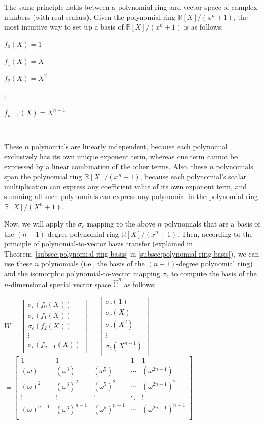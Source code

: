 The same principle holds between a polynomial ring and vector space of complex numbers (with real scalars). Given the polynomial ring $\mathbb{R}[X]/(x^n + 1)$, the most intuitive way to set up a basis of $\mathbb{R}[X]/(x^n + 1)$ is as follows:

$f_0(X) = 1$

$f_1(X) = X$

$f_2(X) = X^2$

$\vdots$

$f_{n-1}(X) = X^{n-1}$

$ $

These $n$ polynomials are linearly independent, because each polynomial exclusively has its own unique exponent term, whereas one term cannot be expressed by a linear combination of the other terms. Also, these $n$ polynomials span the polynomial ring $\mathbb{R}[X]/(x^n + 1)$, because each polynomial's scalar multiplication can express any coefficient value of its own exponent term, and summing all such polynomials can express any polynomial in the polynomial ring $\mathbb{R}[X]/(X^n + 1)$.


Now, we will apply the $\sigma_c$ mapping to the above $n$ polynomials that are a basis of the $(n-1)$-degree polynomial ring $\mathbb{R}[X]/(x^n + 1)$. Then, according to the principle of polynomial-to-vector basis transfer (explained in Theorem~\ref*{subsec:polynomial-ring-basis} in \autoref{subsec:polynomial-ring-basis}), we can use these $n$ polynomials (i.e., the basis of the $(n-1)$-degree polynomial ring) and the isomorphic polynomial-to-vector mapping $\sigma_c$ to compute the basis of the $n$-dimensional special vector space $\hat{\mathbb C}^{n}$ as follows: 

$W = \begin{bmatrix}
\sigma_c(f_0(X)) \\
\sigma_c(f_1(X)) \\
\sigma_c(f_2(X)) \\
\vdots \\
\sigma_c(f_{n-1}(X)) \\
\end{bmatrix}
= \begin{bmatrix}
\sigma_c(1) \\
\sigma_c(X) \\
\sigma_c(X^2) \\
\vdots \\
\sigma_c(X^{n-1}) \\
\end{bmatrix}$
$= \begin{bmatrix}
1 & 1 & \cdots & 1 & 1\\
(\omega) & (\omega^3) & (\omega^5) & \cdots & (\omega^{2n-1})\\
(\omega)^2 & (\omega^3)^2 & (\omega^5)^2 & \cdots & (\omega^{2n-1})^2\\
\vdots & \vdots & \vdots & \ddots & \vdots \\
(\omega)^{n-1} & (\omega^3)^{n-1} & (\omega^5)^{n-1} & \cdots & (\omega^{2n-1})^{n-1}\\
\end{bmatrix}$

